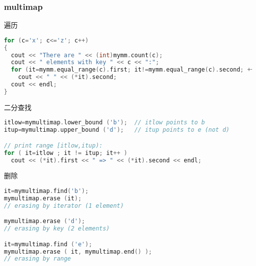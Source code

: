     \subsubsection{multimap}
	遍历\\
	\begin{lstlisting}[language=c++]
for (c='x'; c<='z'; c++)
{
  cout << "There are " << (int)mymm.count(c);
  cout << " elements with key " << c << ":";
  for (it=mymm.equal_range(c).first; it!=mymm.equal_range(c).second; ++it)
    cout << " " << (*it).second;
  cout << endl;
}
	\end{lstlisting}
	二分查找\\
	\begin{lstlisting}[language=c++]
itlow=mymultimap.lower_bound ('b');  // itlow points to b
itup=mymultimap.upper_bound ('d');   // itup points to e (not d)

// print range [itlow,itup):
for ( it=itlow ; it != itup; it++ )
  cout << (*it).first << " => " << (*it).second << endl;
	\end{lstlisting}
	删除\\
	\begin{lstlisting}[language=c++]
it=mymultimap.find('b');
mymultimap.erase (it);                     
// erasing by iterator (1 element)

mymultimap.erase ('d');                    
// erasing by key (2 elements)

it=mymultimap.find ('e');
mymultimap.erase ( it, mymultimap.end() ); 
// erasing by range
	\end{lstlisting}
